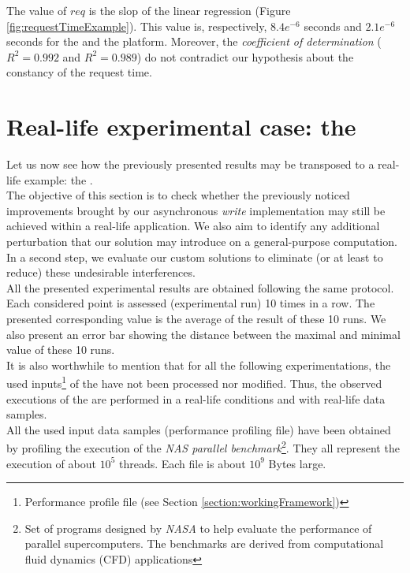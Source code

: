 			The value of $req$ is the slop of the linear regression (Figure \ref{fig:requestTimeExample}).   This value is, respectively, $8.4 e^{-6}$ seconds and $2.1 e^{-6}$ seconds for the \targetPlatformLaptop\space and the \targetPlatformHpc\space platform.   Moreover, the \emph{coefficient of determination} ($R^{2}=0.992$ and $R^{2}=0.989$) do not contradict our hypothesis about the constancy of the \notationaio\space request time.



\section{Real-life experimental case: the \toolTargetSoftware}\label{section:experimentalCase}
	Let us now see how the previously presented results may be transposed to a real-life example: the \toolTargetSoftware.\\
	The objective of this section is to check whether the previously noticed improvements brought by our asynchronous \emph{write} implementation may still be achieved within a real-life application.   We also aim to identify any additional perturbation that our \notationaio\space solution may introduce on a general-purpose computation.    In a second step, we evaluate our custom solutions to eliminate (or at least to reduce) these undesirable interferences.\\

	All the presented experimental results are obtained following the same protocol.   Each considered point is assessed (experimental run) 10 times in a row.   The presented corresponding value is the average of the result of these 10 runs.   We also present an error bar showing the distance between the maximal and minimal value of these 10 runs.\\
	It is also worthwhile to mention that for all the following experimentations, the used inputs\footnote{Performance profile file (see Section \ref{section:workingFramework})} of the \toolTargetSoftware\space have not been processed nor modified.   Thus, the observed executions of the \toolTargetSoftware\space are performed in a real-life conditions and with real-life data samples.\\
	All the used input data samples (performance profiling file) have been obtained by profiling the execution of the \emph{NAS parallel benchmark}\footnote{Set of programs designed by \emph{NASA} to help evaluate the performance of parallel supercomputers. The benchmarks are derived from computational fluid dynamics (CFD) applications}.   They all represent the execution of about $10^{5}$ threads.   Each file is about $10^{9}$ Bytes large.


